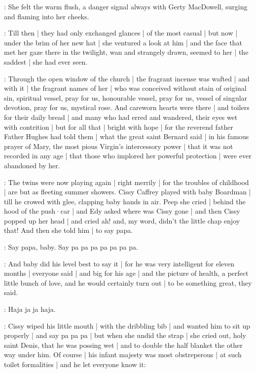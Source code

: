 \gertySex:
She felt the warm flush,
a danger signal always with Gerty MacDowell,
surging and flaming into her cheeks.

\gertyNovel:
Till then |
they had only exchanged glances |
of the most casual |
but now |
under the brim of her new hat |
she ventured a look at him |
and the face that met her gaze there in the twilight,
wan and strangely drawn,
seemed to her |%
the saddest |
she had ever seen.

\Nrelig:
Through the open window of the church |
the fragrant incense was wafted |
and with it |
the fragrant names of her |
who was conceived without stain of original sin,
spiritual vessel,
pray for us,
honourable vessel,
pray for us,
vessel of singular devotion,
pray for us,
mystical rose.
And careworn hearts were there |
and toilers for their daily bread |
and many who had erred and wandered,
their eyes wet with contrition |
but for all that |
bright with hope |
for the reverend father Father Hughes
had told them |
what the great saint Bernard said |
in his famous prayer of Mary,
the most pious Virgin's intercessory power |
that it was not recorded in any age |
that those who implored her powerful protection |%
were ever abandoned by her.

:
The twins were now playing again |
right merrily |
for the troubles of childhood |
are but as fleeting summer showers.
Cissy Caffrey played with baby Boardman |
till he crowed with glee,
clapping baby hands in air.
Peep she cried |
behind the hood of the push·car |
and Edy asked where was Cissy gone |
and then Cissy popped up her head |
and cried ah!
and,
my word,
didn't the little chap enjoy that!
And then she told him |
to say papa.

\cissy:
Say papa,
baby.
Say pa pa pa pa pa pa pa.

:
And baby did his level best to say it |
for he was very intelligent for eleven months |
everyone said |
and big for his age |
and the picture of health,
a perfect little bunch of love,%
and he would certainly turn out |
to be something great,
they said.

\baby:
Haja ja ja haja.

:
Cissy wiped his little mouth |
with the dribbling bib |
and wanted him to sit up properly |
and say pa pa pa |
but when she undid the strap |
she cried out,
holy saint Denis,
that he was possing wet |
and to double the half blanket the other way under him.
Of course |
his infant majesty was most obstreperous |
at such toilet formalities |
and he let everyone know it:

